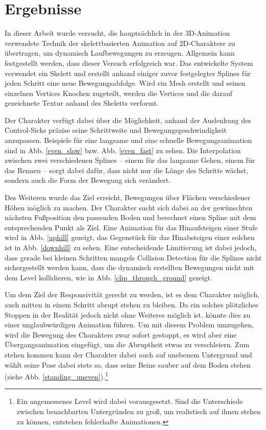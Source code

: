 \chapter{Ergebnisse} \label{ergebnisse}
In dieser Arbeit wurde versucht, die hauptsächlich in der 3D-Animation verwendete Technik der skelettbasierten Animation auf 2D-Charaktere zu übertragen, um dynamisch Laufbewegungen zu erzeugen. Allgemein kann festgestellt werden, dass dieser Versuch erfolgreich war. Das entwickelte System verwendet ein Skelett und erstellt anhand einiger zuvor festgelegter Splines für jeden Schritt eine neue Bewegungsabfolge. Wird ein Mesh erstellt und seinen einzelnen Vertices Knochen zugeteilt, werden die Vertices und die darauf gezeichnete Textur anhand des Skeletts verformt.

Der Charakter verfügt dabei über die Möglichkeit, anhand der Auslenkung des Control-Sicks präzise seine Schrittweite und Bewegungsgeschwindigkeit anzupassen. Beispiele für eine langsame und eine schnelle Bewegungsanimation sind in Abb. \ref{even_slow} bzw. Abb. \ref{even_fast} zu sehen. Die Interpolation zwischen zwei verschiedenen Splines -- einem für das langsame Gehen, einem für das Rennen -- sorgt dabei dafür, dass nicht nur die Länge des Schritts wächst, sondern auch die Form der Bewegung sich verändert.

Des Weiteren wurde das Ziel erreicht, Bewegungen über Flächen verschiedener Höhen möglich zu machen. Der Charakter sucht sich dabei an der gewünschten nächsten Fußposition den passenden Boden und berechnet einen Spline mit dem entsprechenden Punkt als Ziel. Eine Animation für das Hinaufsteigen einer Stufe wird in Abb. \ref{uphill} gezeigt, das Gegenstück für das Hinabsteigen einer solchen ist in Abb. \ref{downhill} zu sehen. Eine entscheidende Limitierung ist dabei jedoch, dass gerade bei kleinen Schritten mangels Collision Detection für die Splines nicht sichergestellt werden kann, dass die dynamisch erstellten Bewegungen nicht mit dem Level kollidieren, wie in Abb. \ref{clip_through_ground} gezeigt.

Um dem Ziel der Responsivität gerecht zu werden, ist es dem Charakter möglich, auch mitten in einem Schritt abrupt stehen zu bleiben. Da ein solches plötzliches Stoppen in der Realität jedoch nicht ohne Weiteres möglich ist, könnte dies zu einer unglaubwürdigen Animation führen. Um mit diesem Problem umzugehen, wird die Bewegung des Charakters zwar sofort gestoppt, es wird aber eine Übergangsanimation eingefügt, um die Abruptheit etwas zu verschleiern. Zum stehen kommen kann der Charakter dabei auch auf unebenem Untergrund und wählt seine Pose dabei stets so, dass seine Beine sauber auf dem Boden stehen (siehe Abb. \ref{standing_uneven}).\footnote{Ein angemessenes Level wird dabei vorausgesetzt. Sind die Unterschiede zwischen benachbarten Untergründen zu groß, um realistisch auf ihnen stehen zu können, entstehen fehlerhafte Animationen.}

